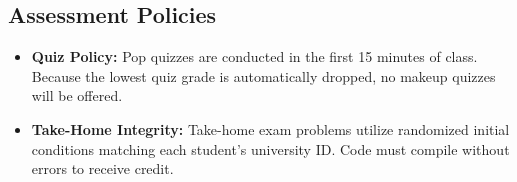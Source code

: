 \documentclass[11pt, letterpaper]{article}
\begin{document}
\subsection*{Assessment Policies}
\begin{itemize}
    \item \textbf{Quiz Policy:} Pop quizzes are conducted in the first 15 minutes of class. Because the lowest quiz grade is automatically dropped, no makeup quizzes will be offered.
    \item \textbf{Take-Home Integrity:} Take-home exam problems utilize randomized initial conditions matching each student's university ID. Code must compile without errors to receive credit.
\end{itemize}
\end{document}
